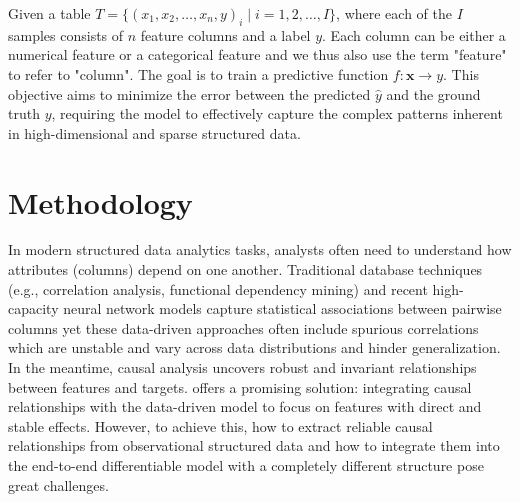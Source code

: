 \documentclass[sigconf, nonacm]{acmart}
\newcommand{\sy}[1]{{\color{black}#1}}
\newcommand{\syadd}[1]{{\color{black}#1}}
\newcommand{\syfix}[1]{{\color{black}#1}}
\newcommand{\syne}[1]{{\color{black}#1}}
\newcommand{\vldb}[1]{{\color{red}#1}}
\begin{document}
\sy{
Given a table $T = \{(x_1, x_2, \dots, x_n, y)_i \mid i = 1, 2, \dots, I\}$, where each of the $I$ samples consists of $n$ feature columns and a label $y$. \syfix{Each column can be either a numerical feature or a categorical feature and 
we thus also use the term "feature" to refer to "column". 
The} goal is to train a predictive function $f: \mathbf{x} \to y$. 
This objective aims to minimize the error between the predicted $\hat{y}$ and the ground truth $y$, requiring the model to effectively capture the complex patterns inherent in high-dimensional and sparse structured data.}

\section{Methodology}

\vldb{
In modern structured data analytics tasks, analysts often need to understand how attributes (columns) depend on one another. 
Traditional database techniques (e.g., correlation analysis, functional dependency mining) and recent high-capacity neural network models capture statistical associations between pairwise columns yet these data-driven approaches often include spurious correlations \syfix{which are unstable and vary across data distributions and} hinder generalization.
}
\syadd{
In the \syne{meantime}, causal analysis uncovers \syfix{robust} and invariant relationships between features and targets\cite{r:causalitydb}. 
\syfix{\syne{This} offers a promising solution: integrating causal relationships
with the data-driven model to focus on features with direct and 
stable effects. 
}
}
\syfix{However, to achieve this, how to extract reliable causal relationships from observational structured data 
and how to integrate them
into the end-to-end differentiable model with a completely different structure 
\syne{pose} great challenges. 
}
\end{document}
